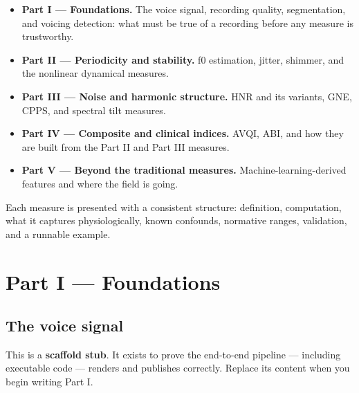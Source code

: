 \documentclass[
  english,
  letterpaper,
]{scrbook}
\providecommand{\tightlist}{%
  \setlength{\itemsep}{0pt}\setlength{\parskip}{0pt}}
\begin{document}
\begin{itemize}
\tightlist
\item
  \textbf{Part I --- Foundations.} The voice signal, recording quality,
  segmentation, and voicing detection: what must be true of a recording
  before any measure is trustworthy.
\item
  \textbf{Part II --- Periodicity and stability.} f0 estimation, jitter,
  shimmer, and the nonlinear dynamical measures.
\item
  \textbf{Part III --- Noise and harmonic structure.} HNR and its
  variants, GNE, CPPS, and spectral tilt measures.
\item
  \textbf{Part IV --- Composite and clinical indices.} AVQI, ABI, and
  how they are built from the Part II and Part III measures.
\item
  \textbf{Part V --- Beyond the traditional measures.}
  Machine-learning-derived features and where the field is going.
\end{itemize}

Each measure is presented with a consistent structure: definition,
computation, what it captures physiologically, known confounds,
normative ranges, validation, and a runnable example.

\part{Part I --- Foundations}

\chapter{The voice signal}\label{the-voice-signal}

\begin{tcolorbox}[enhanced jigsaw, arc=.35mm, bottomrule=.15mm, bottomtitle=1mm, breakable, colback=white, colbacktitle=quarto-callout-note-color!10!white, colframe=quarto-callout-note-color-frame, coltitle=black, left=2mm, leftrule=.75mm, opacityback=0, opacitybacktitle=0.6, rightrule=.15mm, title=\textcolor{quarto-callout-note-color}{\faInfo}\hspace{0.5em}{Note}, titlerule=0mm, toprule=.15mm, toptitle=1mm]

This is a \textbf{scaffold stub}. It exists to prove the end-to-end
pipeline --- including executable code --- renders and publishes
correctly. Replace its content when you begin writing Part I.

\end{tcolorbox}
\end{document}

